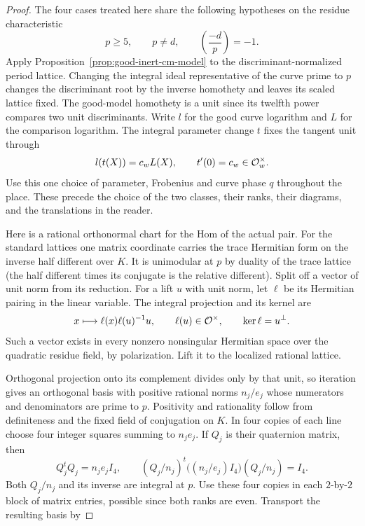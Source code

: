 \begin{proof}

The four cases treated here share the following hypotheses on the residue characteristic
\[
  p\ge5,\qquad p\ne d,\qquad \left(\frac{-d}{p}\right)=-1.
\]
Apply Proposition~\ref{prop:good-inert-cm-model} to the discriminant-normalized
period lattice. Changing the integral ideal representative of the
curve prime to \(p\) changes the discriminant root by the inverse
homothety and leaves its scaled lattice fixed. The good-model
homothety is a unit since its twelfth power compares two unit
discriminants. Write \(l\) for the good curve logarithm and \(L\) for the comparison logarithm. The integral parameter change \(t\) fixes the tangent unit through
\[
  l(t(X))=c_wL(X),\qquad t'(0)=c_w\in{\cal O}_w^\times.
\]
Use this one choice of parameter, Frobenius and curve phase \(q\) throughout the place. These precede the choice of the two classes, their ranks,
their diagrams, and the translations in the reader.


Here is a rational orthonormal chart for the Hom of the actual
pair. For the standard lattices one matrix coordinate carries
the trace Hermitian form on the inverse half different over \(K\).
It is unimodular at \(p\) by duality of the trace lattice
(the half different times its conjugate is the relative
different).
Split off a vector of unit norm from its reduction.
For a lift \(u\) with unit norm, let \(\ell\) be its Hermitian pairing in the linear variable. The integral projection and its kernel are
\[
  x\longmapsto \ell(x)\ell(u)^{-1}u,\qquad \ell(u)\in{\cal O}^{\times},\qquad \ker\ell=u^\perp.
\]
 Such a
vector exists in every nonzero nonsingular Hermitian space over
the quadratic residue field, by polarization. Lift it to the
localized rational lattice.

Orthogonal projection onto its
complement divides only by that unit, so iteration gives an
orthogonal basis with positive rational norms \(n_j/e_j\) whose
numerators and denominators are prime to \(p\). Positivity and
rationality follow from definiteness and the fixed field of
conjugation on \(K\). In four copies of each line choose four
integer squares summing to \(n_je_j\). If \(Q_j\) is their quaternion matrix, then
\[
 Q_j^tQ_j=n_je_j I_4,\qquad
 (Q_j/n_j)^t\bigl((n_j/e_j)I_4\bigr)(Q_j/n_j)=I_4 .
\]
Both \(Q_j/n_j\) and its inverse are integral at \(p\). Use these four copies in each
\(2\)-by-\(2\) block of matrix entries, possible since both
ranks are even. Transport the resulting basis by


\end{proof}

